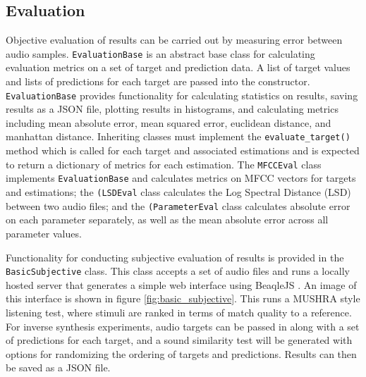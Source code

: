 \subsection{Evaluation}
Objective evaluation of results can be carried out by measuring error between audio samples. \texttt{EvaluationBase} is an abstract base class for calculating evaluation metrics on a set of target and prediction data. A list of target values and lists of predictions for each target are passed into the constructor. \texttt{EvaluationBase} provides functionality for calculating statistics on results, saving results as a JSON file, plotting results in histograms, and calculating metrics including mean absolute error, mean squared error, euclidean distance, and manhattan distance. Inheriting classes must implement the \texttt{evaluate_target()} method which is called for each target and associated estimations and is expected to return a dictionary of metrics for each estimation. The \texttt{MFCCEval} class implements \texttt{EvaluationBase} and calculates metrics on MFCC vectors for targets and estimations; the \texttt{(LSDEval} class calculates the Log Spectral Distance (LSD) between two audio files; and the \texttt{(ParameterEval} class calculates absolute error on each parameter separately, as well as the mean absolute error across all parameter values.

Functionality for conducting subjective evaluation of results is provided in the \texttt{BasicSubjective} class. This class accepts a set of audio files and runs a locally hosted server that generates a simple web interface using BeaqleJS \cite{kraft2014beaqlejs}. An image of this interface is shown in figure \ref{fig:basic_subjective}. This runs a MUSHRA style listening test, where stimuli are ranked in terms of match quality to a reference.  For inverse synthesis experiments, audio targets can be passed in along with a set of predictions for each target, and a sound similarity test will be generated with options for randomizing the ordering of targets and predictions. Results can then be saved as a JSON file.

